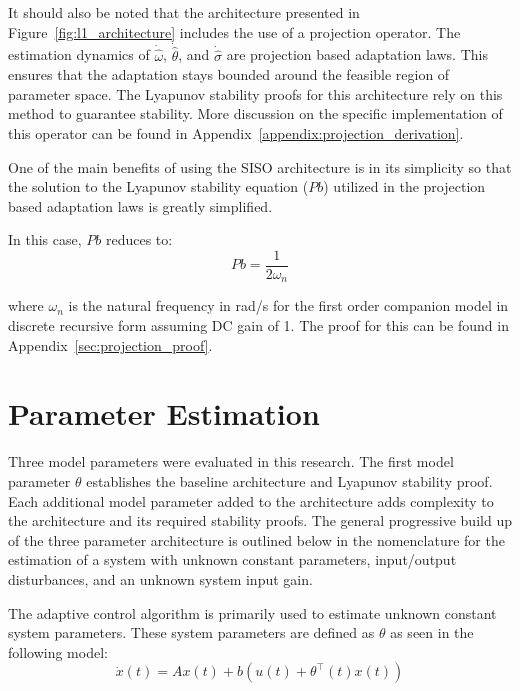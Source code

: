 It should also be noted that the architecture presented in Figure~\ref{fig:l1_architecture} includes the use of a projection operator.  The estimation dynamics of $\dot{\hat{\omega}}$, $\dot{\hat{\theta}}$, and $\dot{\hat{\sigma}}$ are projection based adaptation laws.  This ensures that the adaptation stays bounded around the feasible region of parameter space.  The Lyapunov stability proofs for this architecture rely on this method to guarantee stability\cite{hovakimyan2010l1}.  More discussion on the specific implementation of this operator can be found in Appendix~\ref{appendix:projection_derivation}.

One of the main benefits of using the \ac{SISO} architecture is in its simplicity so that the solution to the Lyapunov stability equation ($Pb$) utilized in the projection based adaptation laws is greatly simplified.  

In this case, $Pb$ reduces to:
\begin{equation}
Pb = \frac{1}{2\omega_n}
\end{equation}

where $\omega_n$ is the natural frequency in rad/s for the first order companion model in discrete recursive form assuming DC gain of 1.  The proof for this can be found in Appendix~\ref{sec:projection_proof}.

\section{\Lone Parameter Estimation}\label{sec:param_estimation}
Three model parameters were evaluated in this research.   The first model parameter $\theta$ establishes the baseline architecture and Lyapunov stability proof.  Each additional  model parameter added to the architecture adds complexity to the architecture and its required stability proofs.  The general progressive build up of the three parameter architecture is outlined below in the nomenclature for the estimation of a system with unknown constant parameters, input/output disturbances, and an unknown system input gain.

The \Lone adaptive control algorithm is primarily used to estimate unknown constant system parameters.  These system parameters are defined as $\theta$ as seen in the following model:
\begin{equation}
\dot{x}(t)=Ax(t)+b(u(t)+\theta^{\top}(t)x(t))
\end{equation}


